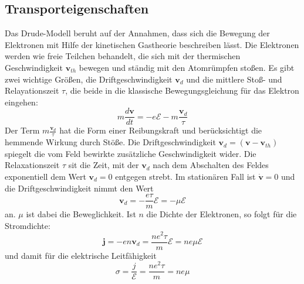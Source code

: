 \documentclass[11pt]{article}
\begin{document}
\subsection{Transporteigenschaften}
Das Drude-Modell beruht auf der Annahmen, dass sich die Bewegung der Elektronen
mit Hilfe der kinetischen Gastheorie beschreiben lässt. Die Elektronen werden
wie freie Teilchen behandelt, die sich mit der thermischen Geschwindigkeit
$\bm{v}_{th}$ bewegen und ständig mit den Atomrümpfen stoßen. Es gibt zwei
wichtige Größen, die Driftgeschwindigkeit $\bm{v}_d$ und die mittlere Stoß- und
Relayationszeit $\tau$, die beide in die klassische Bewegungsgleichung für das
Elektron eingehen:
\begin{equation}
  m\frac{d\bm{v}}{dt}=-e\mathcal{E}-m\frac{\bm{v}_d}{\tau}
\end{equation}
Der Term $m\frac{\bm{v}_d}{\tau}$ hat die Form einer Reibungskraft und
berücksichtigt die hemmende Wirkung durch Stöße. Die Driftgeschwindigkeit
$\bm{v}_d=(\bm{v}-\bm{v}_{th})$ spiegelt die vom Feld bewirkte zusätzliche
Geschwindigkeit wider. Die Relaxationszeit $\tau$ sit die Zeit, mit der
$\bm{v}_d$ nach dem Abschalten des Feldes exponentiell dem Wert $\bm{v}_d=0$
entgegen strebt. Im stationären Fall ist $\dot{\bm{v}}=0$ und die
Driftgeschwindigkeit nimmt den Wert
\begin{equation}
  \bm{v}_d=-\frac{e\tau}{m}\bm{\mathcal{E}}=-\mu\bm{\mathcal{E}}
\end{equation}
an. $\mu$ ist dabei die Beweglichkeit. Ist $n$ die Dichte der Elektronen, so
folgt für die Stromdichte:
\begin{equation}
  \bm{j}=-en\bm{v}_d=\frac{ne^2\tau}{m}\bm{\mathcal{E}}=ne\mu\bm{\mathcal{E}}
\end{equation}
und damit für die elektrische Leitfähigkeit
\begin{equation}
  \sigma=\frac{j}{\mathcal{E}}=\frac{ne^2\tau}{m}=ne\mu
\end{equation}
\end{document}
